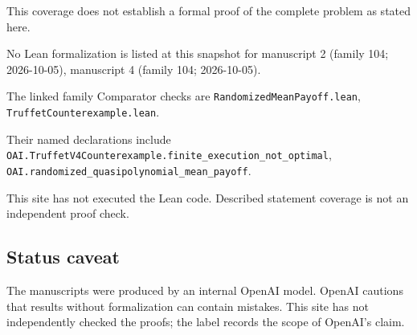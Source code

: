 \documentclass[11pt]{article}
\begin{document}
This coverage does not establish a formal proof of the complete problem as stated here.

No Lean formalization is listed at this snapshot for manuscript 2 (family 104; 2026-10-05), manuscript 4 (family 104; 2026-10-05).

The linked family Comparator checks are \texttt{RandomizedMeanPayoff.lean}, \texttt{TruffetCounterexample.lean}.

Their named declarations include \texttt{OAI.TruffetV4Counterexample.finite\_execution\_not\_optimal}, \texttt{OAI.randomized\_quasipolynomial\_mean\_payoff}.

This site has not executed the Lean code. Described statement coverage is not an independent proof check.

\subsection{Status caveat}
The manuscripts were produced by an internal OpenAI model. OpenAI cautions that results without formalization can contain mistakes. This site has not independently checked the proofs; the label records the scope of OpenAI's claim.
\end{document}
